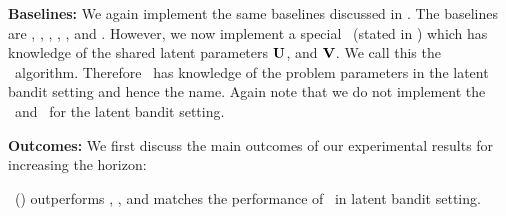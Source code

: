 \textbf{Baselines:} We again implement the same baselines discussed in . The baselines are \pred, \predt, \dptg, \ad, \ts, and \estr. However, we now implement a special \estr\ (stated in ) which has knowledge of the shared latent parameters $\mathbf{U}$, and $\mathbf{V}$. We call this the \estro\ algorithm. Therefore \estro\ has knowledge of the problem parameters in the latent bandit setting and hence the name. 
%
Again note that we do not implement the \linucb\ and \mlin\ for the latent bandit setting.
%



\textbf{Outcomes:} We first discuss the main outcomes of our experimental results for increasing the horizon:

\begin{tcolorbox}
\customfinding \pred\ (\gt) outperforms \dptg, \ad, and matches the performance of \estro\ in latent bandit setting. 
\end{tcolorbox}





